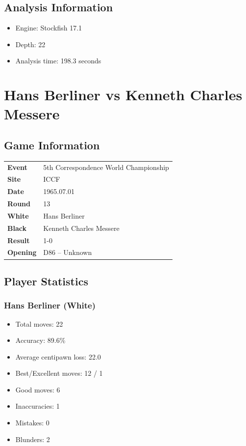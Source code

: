 \documentclass[11pt]{book}
\begin{document}
\section{Analysis Information}
\begin{itemize}
\item Engine: Stockfish 17.1
\item Depth: 22
\item Analysis time: 198.3 seconds
\end{itemize}

\chapter{Hans Berliner vs Kenneth Charles Messere}

\section{Game Information}
\begin{tabular}{ll}
\textbf{Event} & 5th Correspondence World Championship \\
\textbf{Site} & ICCF \\
\textbf{Date} & 1965.07.01 \\
\textbf{Round} & 13 \\
\textbf{White} & Hans Berliner \\
\textbf{Black} & Kenneth Charles Messere \\
\textbf{Result} & 1-0 \\
\textbf{Opening} & D86 -- Unknown \\
\end{tabular}

\section{Player Statistics}

\subsection{Hans Berliner (White)}
\begin{itemize}
\item Total moves: 22
\item Accuracy: 89.6\%
\item Average centipawn loss: 22.0
\item Best/Excellent moves: 12 / 1
\item Good moves: 6
\item Inaccuracies: 1
\item Mistakes: 0
\item Blunders: 2
\end{itemize}
\end{document}
